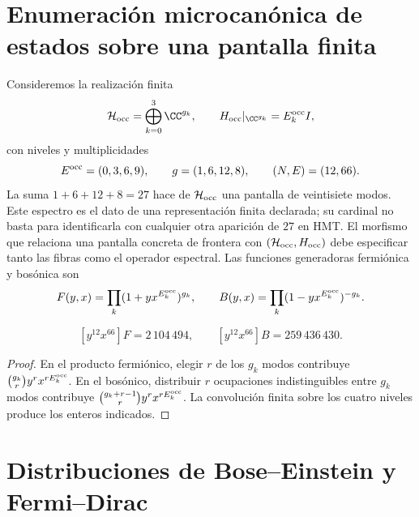 \section{Enumeración microcanónica de estados sobre una pantalla finita}
\label{v:rec:ocupacion:section:01}

Consideremos la realización finita
\[
 \mathcal H_{\rm occ}=\bigoplus_{k=0}^{3}\CC^{g_k},
 \qquad
 H_{\rm occ}|_{\CC^{g_k}}=E_k^{\rm occ} I,
\]
con niveles y multiplicidades
\[
 E^{\rm occ}=(0,3,6,9),\qquad g=(1,6,12,8),
 \qquad(N,E)=(12,66).
\]
La suma \(1+6+12+8=27\) hace de \(\mathcal H_{\rm occ}\) una pantalla de
veintisiete modos. Este espectro es el dato de una representación finita
declarada; su cardinal no basta para identificarla con cualquier otra
aparición de \(27\) en HMT\@. El morfismo que relaciona una pantalla concreta
de frontera con \((\mathcal H_{\rm occ},H_{\rm occ})\) debe especificar tanto
las fibras como el operador espectral.
Las funciones generadoras fermiónica y bosónica son
\[
 F(y,x)=\prod_k(1+yx^{E_k^{\rm occ}})^{g_k},
 \qquad
 B(y,x)=\prod_k(1-yx^{E_k^{\rm occ}})^{-g_k}.
\]

\begin{proposition}
\label{v:rec:prop:cardinalidades-microcanonicas}
\[
 [y^{12}x^{66}]F=2\,104\,494,
 \qquad
 [y^{12}x^{66}]B=259\,436\,430.
\]
\end{proposition}
\begin{proof}
En el producto fermiónico, elegir \(r\) de los \(g_k\) modos contribuye
\(\binom{g_k}{r}y^rx^{rE_k^{\rm occ}}\). En el bosónico, distribuir \(r\)
ocupaciones indistinguibles entre \(g_k\) modos contribuye
\(\binom{g_k+r-1}{r}y^rx^{rE_k^{\rm occ}}\). La convolución finita sobre los
cuatro niveles produce los enteros indicados.
\end{proof}

\section{Distribuciones de Bose--Einstein y Fermi--Dirac}
\label{v:rec:ocupacion:section:02}

